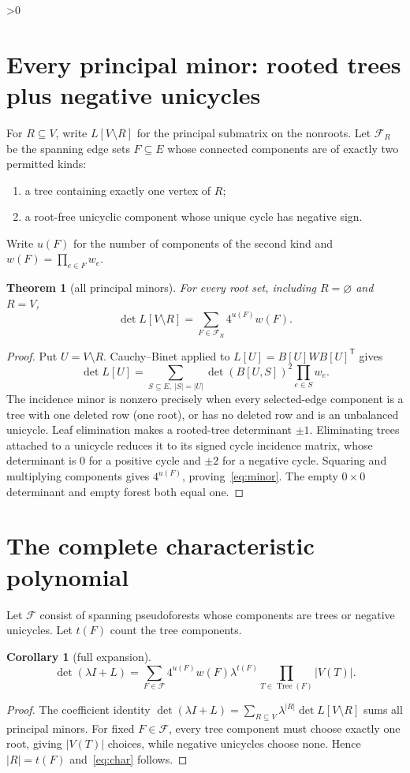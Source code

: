 \documentclass[9pt]{extarticle}
\newtheorem{theorem}{Theorem}
\newtheorem{corollary}{Corollary}
\newcommand{\FF}{\mathcal F}
\begin{document}
\ifnum\CRevisionRound>0
\section{Every principal minor: rooted trees plus negative unicycles}
For $R\subseteq V$, write $L[V\setminus R]$ for the principal submatrix on the
nonroots.  Let $\FF_R$ be the spanning edge sets $F\subseteq E$ whose connected
components are of exactly two permitted kinds:
\begin{enumerate}
\item a tree containing exactly one vertex of $R$;
\item a root-free unicyclic component whose unique cycle has negative sign.
\end{enumerate}
Write $u(F)$ for the number of components of the second kind and
$w(F)=\prod_{e\in F}w_e$.

\begin{theorem}[all principal minors]\label{thm:minors}
For every root set, including $R=\varnothing$ and $R=V$,
\begin{equation}\label{eq:minor}
 \det L[V\setminus R]=\sum_{F\in\FF_R}4^{u(F)}w(F).
\end{equation}
\end{theorem}
\begin{proof}
Put $U=V\setminus R$.  Cauchy--Binet applied to
$L[U]=B[U]WB[U]^{\mathsf T}$ gives
\[
 \det L[U]=\sum_{S\subseteq E,\ |S|=|U|}
 \det(B[U,S])^2\prod_{e\in S}w_e.
\]
The incidence minor is nonzero precisely when every selected-edge component
is a tree with one deleted row (one root), or has no deleted row and is an
unbalanced unicycle.  Leaf elimination makes a rooted-tree determinant
$\pm1$.  Eliminating trees attached to a unicycle reduces it to its signed
cycle incidence matrix, whose determinant is $0$ for a positive cycle and
$\pm2$ for a negative cycle.  Squaring and multiplying components gives
$4^{u(F)}$, proving~\eqref{eq:minor}.  The empty $0\times0$ determinant and
empty forest both equal one.
\end{proof}

\section{The complete characteristic polynomial}
Let $\FF$ consist of spanning pseudoforests whose components are trees or
negative unicycles.  Let $t(F)$ count the tree components.

\begin{corollary}[full expansion]\label{cor:char}
\begin{equation}\label{eq:char}
 \det(\lambda I+L)=
 \sum_{F\in\FF}4^{u(F)}w(F)\lambda^{t(F)}
 \prod_{T\in\operatorname{Tree}(F)}|V(T)|.
\end{equation}
\end{corollary}
\begin{proof}
The coefficient identity
$\det(\lambda I+L)=\sum_{R\subseteq V}\lambda^{|R|}
\det L[V\setminus R]$ sums all principal minors.  For fixed $F\in\FF$, every
tree component must choose exactly one root, giving $|V(T)|$ choices, while
negative unicycles choose none.  Hence $|R|=t(F)$ and~\eqref{eq:char} follows.
\end{proof}
\end{document}

